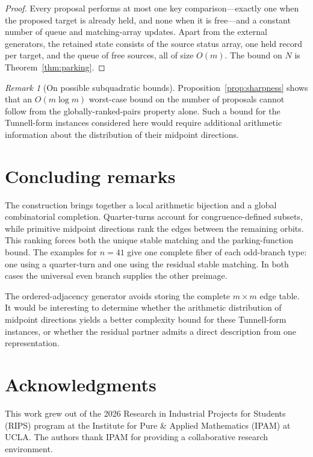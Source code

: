 \documentclass[11pt]{amsart}
\theoremstyle{definition}
\theoremstyle{remark}
\newtheorem{remark}[theorem]{Remark}
\begin{document}
\begin{proof}
Every proposal performs at most one key comparison---exactly one when the
proposed target is already held, and none when it is free---and a constant
number of queue and matching-array updates.  Apart from the external generators, the retained state
consists of the source status array, one held record per target, and the queue
of free sources, all of size $O(m)$.  The bound on $N$ is
Theorem~\ref{thm:parking}.
\end{proof}

\begin{remark}[On possible subquadratic bounds]\label{rem:subquadratic}
Proposition~\ref{prop:sharpness} shows that an $O(m\log m)$ worst-case bound
on the number of proposals cannot follow from the globally-ranked-pairs
property alone.  Such a bound for the Tunnell-form instances considered here
would require additional
arithmetic information about the distribution of their midpoint directions.
\end{remark}

\section{Concluding remarks}\label{sec:audit}

The construction brings together a local arithmetic bijection and a global
combinatorial completion.  Quarter-turns account for congruence-defined
subsets, while primitive midpoint directions rank the edges between the
remaining orbits.  This ranking forces both the unique stable matching and the
parking-function bound.  The examples for $n=41$ give one complete fiber of
each odd-branch type: one using a quarter-turn and one using the residual
stable matching.  In both cases the universal even branch supplies the other
preimage.

The ordered-adjacency generator avoids storing the complete $m\times m$ edge
table.  It would be interesting to determine whether the arithmetic
distribution of midpoint directions yields a better complexity bound for
these Tunnell-form instances, or whether the residual partner admits a direct
description from one representation.

\section*{Acknowledgments}

This work grew out of the 2026 Research in Industrial Projects for Students
(RIPS) program at the Institute for Pure \& Applied Mathematics (IPAM) at
UCLA.  The authors thank IPAM for providing a collaborative research
environment.
\end{document}
